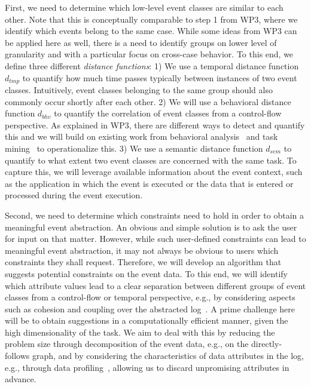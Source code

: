  First, we need to determine which low-level event classes are similar to each other. Note that this is conceptually comparable to step 1 from WP3, where we identify which events belong to the same case. While some ideas from WP3 can be applied here as well, there is a need to identify groups on lower level of granularity and with a particular focus on cross-case behavior. To this end, we define three different \textit{distance functions}: 
1) We use a temporal distance function $d_{tmp}$ to quantify how much time passes typically between instances of two event classes. Intuitively, event classes belonging to the same group should also commonly occur shortly after each other. 
2) We will use a behavioral distance function $d_{bhv}$ to quantify the correlation of event classes from a control-flow perspective.
As explained in WP3, there are different ways to detect and quantify this and we will build on existing work from behavioral analysis~\cite{diba2020extraction,ferreira2009discovering} and task mining~\cite{leno2020identifying,Urabe21} to operationalize this.  
3) We use a semantic distance function $d_{sem}$ to quantify to what extent two event classes are concerned with the same task. To capture this, we will leverage available information about the event context, such as the application in which the event is executed or the data that is entered or processed during the event execution. 

 Second, we need to determine which constraints need to hold in order to obtain a meaningful event abstraction. An obvious and simple solution is to ask the user for input on that matter. However, while such user-defined constraints can lead to meaningful event abstraction, it may not always be obvious to users which constraints they shall request. Therefore, we will develop an algorithm that suggests potential constraints on the event data. To this end, we will identify which attribute values  lead to a clear separation between different groups of event classes from a control-flow or temporal perspective, e.g., by considering aspects such as cohesion and coupling over the  abstracted log~\cite{vanderfeesten2007quality}. A prime challenge here will be to obtain suggestions in a computationally efficient manner, given the high dimensionality of the task. We aim to deal with this by reducing the problem size through decomposition of the event data, e.g., on the directly-follows graph, and by considering the characteristics of data attributes in the log, e.g., through data profiling~\cite{papenbrock2015data}, allowing us to discard unpromising attributes in advance.

